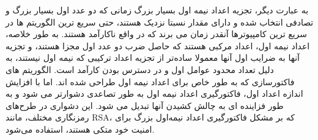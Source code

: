 \documentclass{article}
\begin{document}
به عبارت دیگر، تجزیه اعداد نیمه اول بسیار بزرگ زمانی که دو عدد اول بسیار بزرگ و تصادفی انتخاب شده و دارای مقدار نسبتا نزدیک هستند، حتی سریع ترین الگوریتم ها در سریع ترین کامپیوترها آنقدر زمان می برند که در واقع ناکارآمد هستند.
به طور خلاصه، اعداد نیمه اول، اعداد مرکبی هستند که حاصل ضرب دو عدد اول مجزا هستند، و تجزیه آنها به ضرایب اول آنها معمولا ساده‌تر از تجزیه اعداد ترکیبی که نیمه اول نیستند، به دلیل تعداد محدود عوامل اول و در دسترس بودن کارآمد است. الگوریتم های فاکتورسازی که به طور خاص برای اعداد نیمه اول طراحی شده اند. اما با افزایش اندازه اعداد اول، فاکتورگیری اعداد نیمه اول به طور تصاعدی دشوارتر می شود و به طور فزاینده ای به چالش کشیدن آنها تبدیل می شود. این دشواری در طرح‌های رمزنگاری مختلف، مانند RSA، که بر مشکل فاکتورگیری اعداد نیمه‌اول بزرگ برای امنیت خود متکی هستند، استفاده می‌شود.
\end{document}
